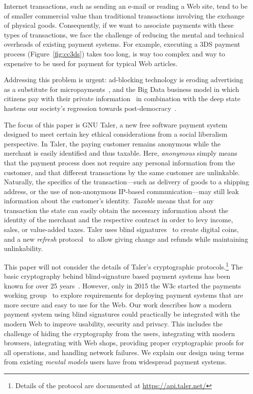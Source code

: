 \documentclass{llncs}
\begin{document}
Internet transactions, such as sending an e-mail or reading a Web
site, tend to be of smaller commercial value than traditional
transactions involving the exchange of physical goods.  Consequently,
if we want to associate payments with these types of transactions, we
face the challenge of reducing the mental and technical overheads of
existing payment systems.  For example, executing a 3DS payment
process (Figure~\ref{fig:cc3ds}) takes too long, is way too complex
and way to expensive to be used for payment for typical Web articles.

Addressing this problem is urgent: ad-blocking technology is eroding
advertising as a substitute for micropayments~\cite{adblockblocks},
and the Big Data business model in which citizens pay with their
private information~\cite{ehrenberg2014data} in combination with the
deep state hastens our society's regression towards
post-democracy~\cite{rms2013democracy}.


The focus of this paper is GNU Taler, a new free software payment
system designed to meet certain key ethical considerations from a
social liberalism perspective. In Taler, the paying customer remains
anonymous while the merchant is easily identified and thus taxable.
Here, {\em anonymous} simply means that the payment process does not require
any personal information from the customer, and that different
transactions by the same customer are unlinkable.  Naturally, the
specifics of the transaction---such as delivery of goods to a shipping
address, or the use of non-anonymous IP-based communication---may
still leak information about the customer's identity.  {\em Taxable}
means that for any transaction the state can easily obtain the
necessary information about the identity of the merchant and the
respective contract in order to levy income, sales, or value-added
taxes. Taler uses blind signatures~\cite{chaum1983blind} to create
digital coins, and a new {\em refresh} protocol~\cite{talercrypto} to
allow giving change and refunds while maintaining unlinkability.

This paper will not consider the details of Taler's cryptographic
protocols.\footnote{Details of the protocol are documented at
  \url{https://api.taler.net/}} The basic cryptography behind
blind-signature based payment systems has been known for over 25
years~\cite{chaum1990untraceable}.  However, only in 2015 the W3c
started the payments working group~\cite{pigs} to explore requirements
for deploying payment systems that are more secure and easy to use for
the Web.  Our work describes how a modern payment system using blind
signatures could practically be integrated with the modern Web to
improve usability, security and privacy.  This includes the challenge
of hiding the cryptography from the users, integrating with modern
browsers, integrating with Web shops, providing proper cryptographic
proofs for all operations, and handling network failures.  We explain
our design using terms from existing {\em mental models} users have
from widespread payment systems.
\end{document}
